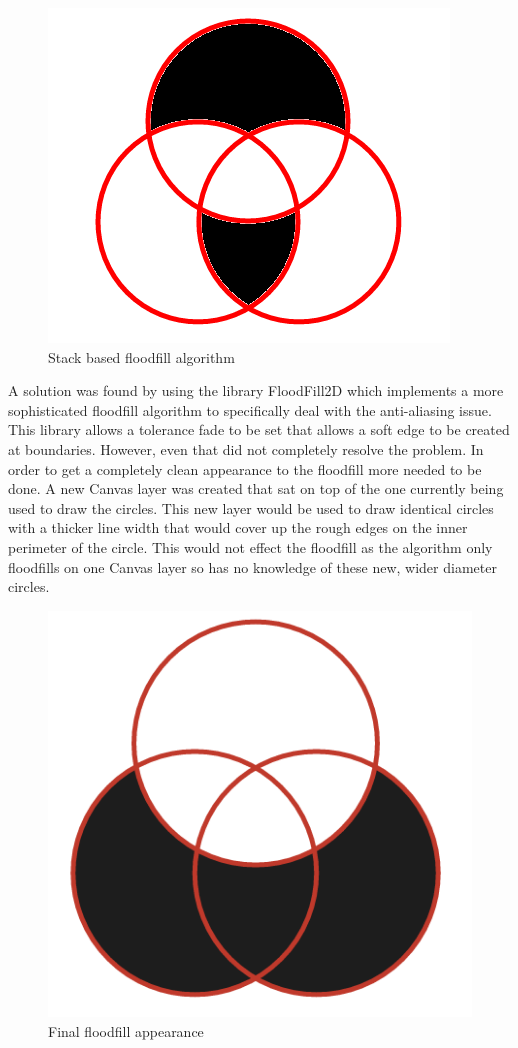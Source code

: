 \documentclass[12pt,a4paper]{report}
\begin{document}
\begin{figure}[h]
\centering
    \includegraphics[scale=0.5]{floodFillBad}
    \caption{Stack based floodfill algorithm}
    \label{fig:floodFillBad}
\end{figure}
\FloatBarrier

	A solution was found by using the library FloodFill2D which implements a more sophisticated floodfill algorithm to specifically deal with the anti-aliasing issue. This library allows a tolerance fade to be set that allows a soft edge to be created at boundaries. However, even that did not completely resolve the problem. In order to get a completely clean appearance to the floodfill more needed to be done. A new Canvas layer was created that sat on top of the one currently being used to draw the circles. This new layer would be used to draw identical circles with a thicker line width that would cover up the rough edges on the inner perimeter of the circle. This would not effect the floodfill as the algorithm only floodfills on one Canvas layer so has no knowledge of these new, wider diameter circles.
	
	\begin{figure}[h]
\centering
    \includegraphics[scale=0.4]{floodFillGood}
    \caption{Final floodfill appearance}
    \label{fig:floodFillGood}
\end{figure}
\FloatBarrier
	
\end{document}
